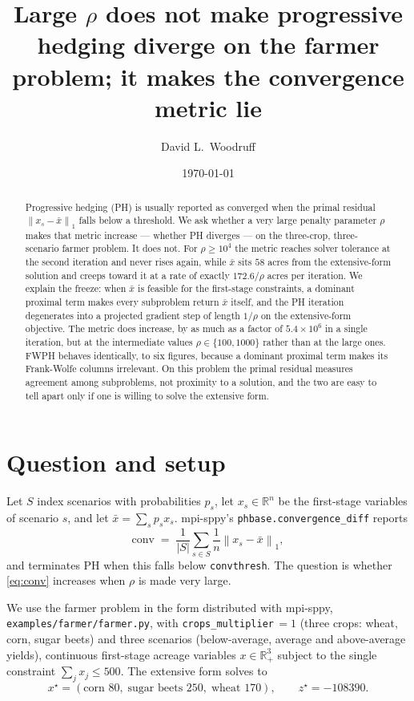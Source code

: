 \documentclass[11pt]{article}
\title{Large $\rho$ does not make progressive hedging diverge on the
farmer problem; it makes the convergence metric lie}
\author{David L.\ Woodruff}
\date{\today}
\newcommand{\norm}[1]{\left\lVert #1 \right\rVert}
\newcommand{\xbar}{\bar{x}}
\newcommand{\R}{\mathbb{R}}
\begin{document}
\maketitle

\begin{abstract}
Progressive hedging (PH) is usually reported as converged when the primal
residual $\norm{x_s - \xbar}_1$ falls below a threshold.  We ask whether a very
large penalty parameter $\rho$ makes that metric increase --- whether PH
diverges --- on the three-crop, three-scenario farmer problem.  It does not.
For $\rho \ge 10^4$ the metric reaches solver tolerance at the second iteration
and never rises again, while $\xbar$ sits $58$ acres from the extensive-form
solution and creeps toward it at a rate of exactly $172.6/\rho$ acres per
iteration.  We explain the freeze: when $\xbar$ is feasible for the first-stage
constraints, a dominant proximal term makes every subproblem return $\xbar$
itself, and the PH iteration degenerates into a projected gradient step of
length $1/\rho$ on the extensive-form objective.  The metric does increase, by
as much as a factor of $5.4 \times 10^6$ in a single iteration, but at the
intermediate values $\rho \in \{100, 1000\}$ rather than at the large ones.
FWPH behaves identically, to six figures, because a dominant proximal term
makes its Frank-Wolfe columns irrelevant.  On
this problem the primal residual measures agreement among subproblems, not
proximity to a solution, and the two are easy to tell apart only if one is
willing to solve the extensive form.
\end{abstract}

\section{Question and setup}

Let $S$ index scenarios with probabilities $p_s$, let $x_s \in \R^n$ be the
first-stage variables of scenario $s$, and let
$\xbar = \sum_s p_s x_s$.  mpi-sppy's \texttt{phbase.convergence\_diff} reports
\begin{equation}
  \label{eq:conv}
  \mathrm{conv} \;=\; \frac{1}{|S|}\sum_{s\in S} \frac{1}{n}\norm{x_s - \xbar}_1 ,
\end{equation}
and terminates PH when this falls below \texttt{convthresh}.  The question is
whether \eqref{eq:conv} increases when $\rho$ is made very large.

We use the farmer problem \cite{birge} in the form distributed with mpi-sppy,
\texttt{examples/farmer/farmer.py}, with \texttt{crops\_multiplier}$\,=1$
(three crops: wheat, corn, sugar beets) and three scenarios (below-average,
average and above-average yields), continuous first-stage acreage variables
$x \in \R^3_+$ subject to the single constraint $\sum_j x_j \le 500$.  The
extensive form solves to
\[
  x^\star = (\text{corn } 80,\; \text{sugar beets } 250,\; \text{wheat } 170),
  \qquad z^\star = -108390 .
\]
\end{document}
